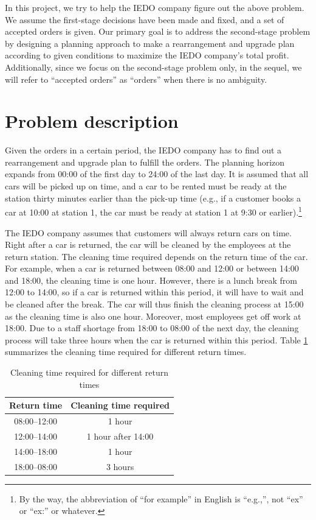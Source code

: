\documentclass[11pt,a4paper]{article}
\begin{document}
In this project, we try to help the IEDO company figure out the above problem. We assume the first-stage decisions have been made and fixed, and a set of accepted orders is given. Our primary goal is to address the second-stage problem by designing a planning approach to make a rearrangement and upgrade plan according to given conditions to maximize the IEDO company's total profit. Additionally, since we focus on the second-stage problem only, in the sequel, we will refer to ``accepted orders'' as ``orders'' when there is no ambiguity. 










\section{Problem description}
\label{sec-problem}

Given the orders in a certain period, the IEDO company has to find out a rearrangement and upgrade plan to fulfill the orders.
The planning horizon expands from 00:00 of the first day to 24:00 of the last day. It is assumed that all cars will be picked up on time, and a car to be rented must be ready at the station thirty minutes earlier than the pick-up time (e.g., if a customer books a car at 10:00 at station 1, the car must be ready at station 1 at 9:30 or earlier).\footnote{By the way, the abbreviation of ``for example'' in English is ``e.g.,'', not ``ex'' or ``ex:'' or whatever.}

The IEDO company assumes that customers will always return cars on time. Right after a car is returned, the car will be cleaned by the employees at the return station. The cleaning time required depends on the return time of the car. For example, when a car is returned between 08:00 and 12:00 or between 14:00 and 18:00, the cleaning time is one hour. However, there is a lunch break from 12:00 to 14:00, so if a car is returned within this period, it will have to wait and be cleaned after the break. The car will thus finish the cleaning process at 15:00 as the cleaning time is also one hour. Moreover, most employees get off work at 18:00. Due to a staff shortage from 18:00 to 08:00 of the next day, the cleaning process will take three hours when the car is returned within this period. Table \ref{tab:cleaning_time} summarizes the cleaning time required for different return times.

\begin{table}[!hbt]
\centering
\begin{tabular}{c|c}
\toprule
Return time & Cleaning time required \\
\midrule
    08:00--12:00 & 1 hour \\
    12:00--14:00 & 1 hour after 14:00 \\
    14:00--18:00 & 1 hour \\
    18:00--08:00 & 3 hours \\
\bottomrule
\end{tabular}
\caption{Cleaning time required for different return times}
\label{tab:cleaning_time}
\end{table}
\end{document}
